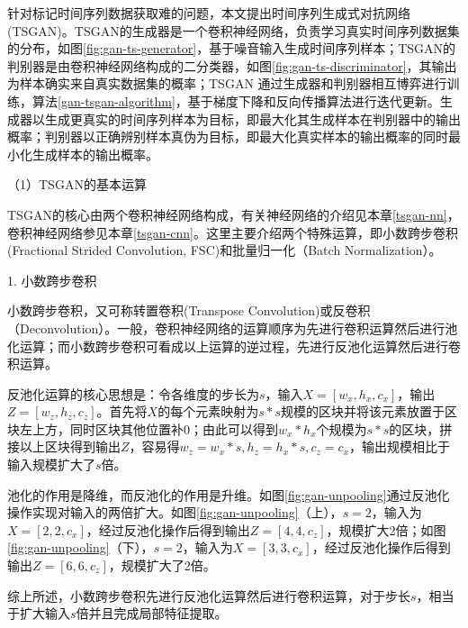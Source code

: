 针对标记时间序列数据获取难的问题，本文提出时间序列生成式对抗网络(TSGAN)。TSGAN的生成器是一个卷积神经网络，负责学习真实时间序列数据集的分布，如图\ref{fig:gan-ts-generator}，基于噪音输入生成时间序列样本；TSGAN的判别器是由卷积神经网络构成的二分类器，如图\ref{fig:gan-ts-discriminator}，其输出为样本确实来自真实数据集的概率；TSGAN 通过生成器和判别器相互博弈进行训练，算法\ref{gan-tsgan-algorithm}，基于梯度下降和反向传播算法进行迭代更新。生成器以生成更真实的时间序列样本为目标，即最大化其生成样本在判别器中的输出概率；判别器以正确辨别样本真伪为目标，即最大化真实样本的输出概率的同时最小化生成样本的输出概率。

（1）TSGAN的基本运算

TSGAN的核心由两个卷积神经网络构成，有关神经网络的介绍见本章\ref{tsgan-nn}，卷积神经网络参见本章\ref{tsgan-cnn}。这里主要介绍两个特殊运算，即小数跨步卷积(Fractional Strided Convolution, FSC)\cite{dosovitskiy2015learning}和批量归一化（Batch Normalization）\cite{ioffe2015batch}。

1. 小数跨步卷积

小数跨步卷积，又可称转置卷积(Transpose Convolution)或反卷积（Deconvolution）。一般，卷积神经网络的运算顺序为先进行卷积运算然后进行池化运算；而小数跨步卷积可看成以上运算的逆过程，先进行反池化运算然后进行卷积运算。

反池化运算的核心思想是：令各维度的步长为$s$，输入$X=[w_{x}, h_{x}, c_{x}]$，输出$Z=[w_{z}, h_{z}, c_{z}]$。首先将$X$的每个元素映射为$s*s$规模的区块并将该元素放置于区块左上方，同时区块其他位置补0；由此可以得到$w_{x}*h_{x}$个规模为$s*s$的区块，拼接以上区块得到输出$Z$，容易得$w_{z}=w_{x}*s, h_{z} = h_{x}*s, c_{z}=c_{x}$，输出规模相比于输入规模扩大了$s$倍。

池化的作用是降维，而反池化的作用是升维。如图\ref{fig:gan-unpooling}通过反池化操作实现对输入的两倍扩大。如图\ref{fig:gan-unpooling}（上），$s=2$，输入为$X=[2, 2, c_{x}]$，经过反池化操作后得到输出$Z=[4, 4, c_{z}]$，规模扩大2倍；如图\ref{fig:gan-unpooling}（下），$s=2$，输入为$X=[3, 3, c_{x}]$，经过反池化操作后得到输出$Z=[6, 6, c_{z}]$，规模扩大了2倍。

综上所述，小数跨步卷积先进行反池化运算然后进行卷积运算，对于步长$s$，相当于扩大输入$s$倍并且完成局部特征提取。

